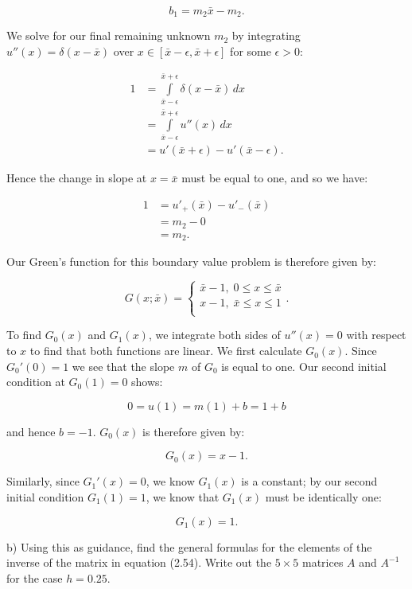 \begin{solution}
    $$
    b_1 = m_2 \bar{x} - m_2.
    $$

    We solve for our final remaining unknown $m_2$ by integrating $u''(x) = \delta(x - \bar{x})$ over 
    $x \in [\bar{x} - \epsilon, \bar{x} + \epsilon]$ for some $\epsilon > 0$:

    \begin{align*}
        1 &= \int\limits_{\bar{x} - \epsilon}^{\bar{x} + \epsilon}{\delta(x - \bar{x})\, dx} \\
          &= \int\limits_{\bar{x} - \epsilon}^{\bar{x} + \epsilon}{u''(x)\, dx} \\
          &= u'(\bar{x} + \epsilon) - u'(\bar{x} - \epsilon).
    \end{align*}

    Hence the change in slope at $x = \bar{x}$ must be equal to one, and so we have:

    \begin{align*}
        1 &= u'_+(\bar{x}) - u'_-(\bar{x}) \\
          &= m_2 - 0 \\
          &= m_2.
    \end{align*}

    Our Green's function for this boundary value problem is therefore given by:

    $$
    G(x; \bar{x}) = \begin{cases}
        \bar{x} - 1,\; 0 \le x \le \bar{x} \\
        x - 1,\; \bar{x} \le x \le 1 \\
    \end{cases}.
    $$

    To find $G_0(x)$ and $G_1(x)$, we integrate both sides of $u''(x) = 0$ with respect to $x$ to find that both
    functions are linear. We first calculate $G_0(x)$. Since $G_0'(0) = 1$ we see that the slope $m$ of $G_0$ is equal
    to one. Our second initial condition at $G_0(1) = 0$ shows:
    
    $$
    0 = u(1) = m(1) + b = 1 + b
    $$

    and hence $b = -1$. $G_0(x)$ is therefore given by:

    $$
    G_0(x) = x - 1.
    $$

    Similarly, since $G_1'(x) = 0$, we know $G_1(x)$ is a constant; by our second initial condition $G_1(1) = 1$, we 
    know that $G_1(x)$ must be identically one:

    $$
    G_1(x) = 1.
    $$
\end{solution}

\pagebreak
b) Using this as guidance, find the general formulas for the elements of the inverse of the matrix in equation (2.54).
   Write out the $5 \times 5$ matrices $A$ and $A^{-1}$ for the case $h = 0.25$.

\begin{solution}\ \\\\
\end{solution}